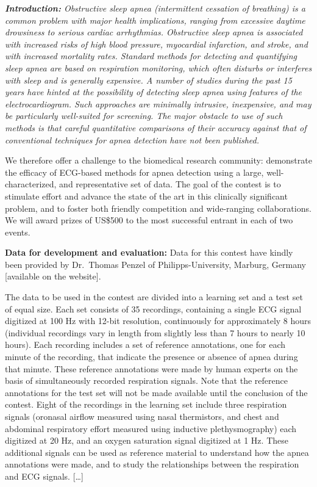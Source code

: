 \documentclass[]{article}
\begin{document}
{\it %
  {\rm \textbf{Introduction:}}
  Obstructive sleep apnea (intermittent cessation of breathing) is a
  common problem with major health implications, ranging from
  excessive daytime drowsiness to serious cardiac arrhythmias.
  Obstructive sleep apnea is associated with increased risks of high
  blood pressure, myocardial infarction, and stroke, and with
  increased mortality rates. Standard methods for detecting and
  quantifying sleep apnea are based on respiration monitoring, which
  often disturbs or interferes with sleep and is generally expensive.
  A number of studies during the past 15 years have hinted at the
  possibility of detecting sleep apnea using features of the
  electrocardiogram. Such approaches are minimally intrusive,
  inexpensive, and may be particularly well-suited for screening. The
  major obstacle to use of such methods is that careful quantitative
  comparisons of their accuracy against that of conventional
  techniques for apnea detection have not been published.

  We therefore offer a challenge to the biomedical research community:
  demonstrate the efficacy of ECG-based methods for apnea detection
  using a large, well-characterized, and representative set of data.
  The goal of the contest is to stimulate effort and advance the state
  of the art in this clinically significant problem, and to foster
  both friendly competition and wide-ranging collaborations. We will
  award prizes of US\$500 to the most successful entrant in each of two
  events.

  {\rm \textbf{Data for development and evaluation:}}
  Data for this contest have kindly been provided by Dr.\ Thomas
  Penzel  of Philipps-University, Marburg,
  Germany [available on the website].

  The data to be used in the contest are divided into a learning set
  and a test set of equal size. Each set consists of 35 recordings,
  containing a single ECG signal digitized at 100 Hz with 12-bit
  resolution, continuously for approximately 8 hours (individual
  recordings vary in length from slightly less than 7 hours to nearly
  10 hours). Each recording includes a set of reference annotations,
  one for each minute of the recording, that indicate the presence or
  absence of apnea during that minute. These reference annotations
  were made by human experts on the basis of simultaneously recorded
  respiration signals. Note that the reference annotations for the
  test set will not be made available until the conclusion of the
  contest. Eight of the recordings in the learning set include three
  respiration signals (oronasal airflow measured using nasal
  thermistors, and chest and abdominal respiratory effort measured
  using inductive plethysmography) each digitized at 20 Hz, and an
  oxygen saturation signal digitized at 1 Hz. These additional signals
  can be used as reference material to understand how the apnea
  annotations were made, and to study the relationships between the
  respiration and ECG signals. [\ldots]

}
\end{document}
